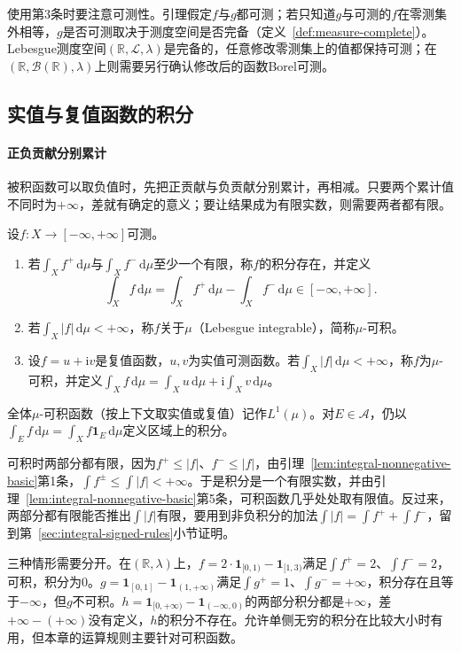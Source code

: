 使用第3条时要注意可测性。引理假定$f$与$g$都可测；若只知道$g$与可测的$f$在零测集外相等，$g$是否可测取决于测度空间是否完备（定义~\ref{def:measure-complete}）。Lebesgue测度空间$(\mathbb R,\mathcal L,\lambda)$是完备的，任意修改零测集上的值都保持可测；在$(\mathbb R,\mathcal B(\mathbb R),\lambda)$上则需要另行确认修改后的函数Borel可测。

\subsection{实值与复值函数的积分}
\label{sec:integral-real-complex}

\paragraph{正负贡献分别累计}
被积函数可以取负值时，先把正贡献与负贡献分别累计，再相减。只要两个累计值不同时为$+\infty$，差就有确定的意义；要让结果成为有限实数，则需要两者都有限。

\begin{definition}[积分存在与Lebesgue可积]
\label{def:integral-integrable}
设$f:X\to[-\infty,+\infty]$可测。
\begin{enumerate}
 \item 若$\int_Xf^+\,\mathrm d\mu$与$\int_Xf^-\,\mathrm d\mu$至少一个有限，称$f$的积分存在，并定义
 \[
  \int_Xf\,\mathrm d\mu=\int_Xf^+\,\mathrm d\mu-\int_Xf^-\,\mathrm d\mu\in[-\infty,+\infty].
 \]
 \item 若$\int_X|f|\,\mathrm d\mu<+\infty$，称$f$关于$\mu$（Lebesgue integrable），简称$\mu$-可积。
 \item 设$f=u+\mathrm iv$是复值函数，$u,v$为实值可测函数。若$\int_X|f|\,\mathrm d\mu<+\infty$，称$f$为$\mu$-可积，并定义$\int_Xf\,\mathrm d\mu=\int_Xu\,\mathrm d\mu+\mathrm i\int_Xv\,\mathrm d\mu$。
\end{enumerate}
全体$\mu$-可积函数（按上下文取实值或复值）记作$L^1(\mu)$。对$E\in\mathcal A$，仍以$\int_Ef\,\mathrm d\mu=\int_Xf\mathbf 1_E\,\mathrm d\mu$定义区域上的积分。
\end{definition}

可积时两部分都有限，因为$f^+\le|f|$、$f^-\le|f|$，由引理~\ref{lem:integral-nonnegative-basic}第1条，$\int f^\pm\le\int|f|<+\infty$。于是积分是一个有限实数，并由引理~\ref{lem:integral-nonnegative-basic}第5条，可积函数几乎处处取有限值。反过来，两部分都有限能否推出$\int|f|$有限，要用到非负积分的加法$\int|f|=\int f^++\int f^-$，留到第~\ref{sec:integral-signed-rules}小节证明。

三种情形需要分开。在$(\mathbb R,\lambda)$上，$f=2\cdot\mathbf 1_{[0,1)}-\mathbf 1_{[1,3)}$满足$\int f^+=2$、$\int f^-=2$，可积，积分为$0$。$g=\mathbf 1_{[0,1]}-\mathbf 1_{(1,+\infty)}$满足$\int g^+=1$、$\int g^-=+\infty$，积分存在且等于$-\infty$，但$g$不可积。$h=\mathbf 1_{[0,+\infty)}-\mathbf 1_{(-\infty,0)}$的两部分积分都是$+\infty$，差$+\infty-(+\infty)$没有定义，$h$的积分不存在。允许单侧无穷的积分在比较大小时有用，但本章的运算规则主要针对可积函数。

